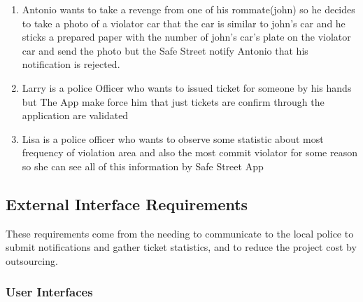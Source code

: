 \documentclass{article}
\newcommand{\enum}[1]{\texttt{#1.\arabic*}}
\begin{document}
\begin{enumerate}[label=\enum{S}]
		\item\label{S:cheating}Antonio wants to take a revenge from one of  his rommate(john) so he decides to take a photo of a violator car that the car is similar to john's car and he sticks a prepared paper with the number of john's car's plate on the violator car and send the photo but the Safe Street notify Antonio that his notification is rejected.
		\item\label{S:manually ticket}Larry is a police Officer who wants to issued ticket for someone by his hands but The App make force him that just  tickets are confirm through the application are validated
		\item Lisa is a police officer who wants to observe some statistic about most frequency of violation area and also the most commit violator for some reason so she can see all of this information by Safe Street App 
	\end{enumerate}

\newpage
	\subsection{External Interface Requirements}
		These requirements come from the needing to communicate to the local police to submit notifications and gather ticket statistics, and to reduce the project cost by outsourcing.
		
		\subsubsection{User Interfaces}
		
\end{document}

